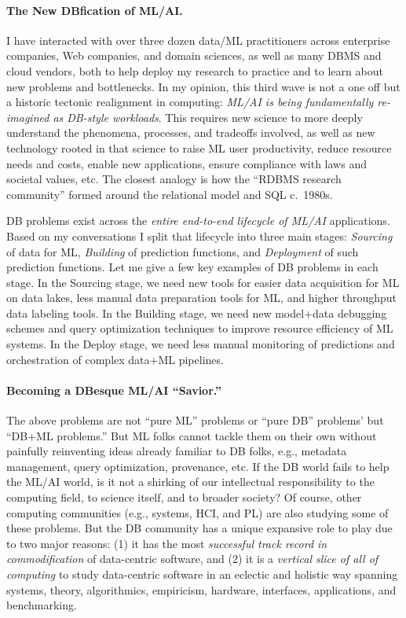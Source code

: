 \documentclass[11pt]{article}
\begin{document}
\paragraph{The New DBfication of ML/AI.} 
I have interacted with over three dozen data/ML practitioners across enterprise companies, Web companies, and domain sciences, as 
well as many DBMS and cloud vendors, both to help deploy my research to practice and to learn about new problems and bottlenecks.
In my opinion, this third wave is not a one off but a historic tectonic realignment in computing: \textit{ML/AI is being fundamentally 
re-imagined as DB-style workloads}. This requires new science to more deeply understand the phenomena, processes, and 
tradeoffs involved, as well as new technology rooted in that science to raise ML user productivity, reduce resource needs and costs, 
enable new applications, ensure compliance with laws and societal values, etc. 
The closest analogy is how the ``RDBMS research community'' formed around the relational model and SQL c.~1980s. 

DB problems exist across the \textit{entire end-to-end lifecycle of ML/AI} applications. Based on my conversations I split that 
lifecycle into three main stages: \textit{Sourcing} of data for ML, \textit{Building} of prediction functions, and \textit{Deployment}
of such prediction functions. Let me give a few key examples of DB problems in each stage. In the Sourcing stage, we need 
new tools for easier data acquisition for ML on data lakes, less manual data preparation tools for ML, and higher throughput data 
labeling tools. In the Building stage, we need new model+data debugging schemes and query optimization techniques to improve
resource efficiency of ML systems. In the Deploy stage, we need less manual monitoring of predictions and orchestration
of complex data+ML pipelines.

\paragraph{Becoming a DBesque ML/AI ``Savior.''}
The above problems are not ``pure ML'' problems or ``pure DB'' problems' but ``DB+ML problems.'' But ML folks cannot tackle 
them on their own without painfully reinventing ideas already familiar to DB folks, e.g., metadata management, query optimization, 
provenance, etc. If the DB world fails to help the ML/AI world, is it not a shirking of our intellectual responsibility to the 
computing field, to science itself, and to broader society? Of course, other computing communities (e.g., systems, HCI, and PL) 
are also studying some of these problems. But the DB community has a unique expansive role to play due to two major reasons: 
(1) it has the most \textit{successful track record in commodification} of data-centric software, and 
(2) it is a \textit{vertical slice of all of computing} to study data-centric software in an eclectic and holistic way spanning 
systems, theory, algorithmics, empiricism, hardware, interfaces, applications, and benchmarking.
\end{document}
